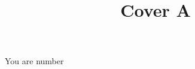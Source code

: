 \documentclass{article}
\title{Cover A}
\begin{document}
\maketitle

You are number {\Huge\tagnumber}

\filetotag
\end{document}
